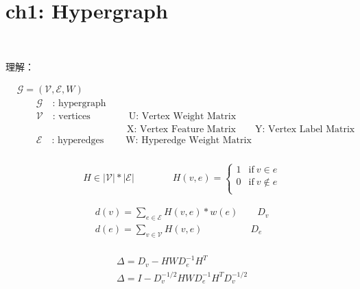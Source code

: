 \documentclass{article}
\begin{document}
\section*{ch1: Hypergraph}


~ \\[3pt]
\begin{CJK}{UTF8}{gbsn}
    理解： \\[3pt]
\end{CJK}


%
\begin{align*}
    & \mathcal{G} = ( \mathcal{V} , \mathcal{E} , W ) \\[3pt]
        & \qquad \mathcal{G} \quad \text{: hypergraph} \\[3pt]
        & \qquad \mathcal{V} \quad \text{: vertices} 
          \qquad \qquad \text{U: Vertex Weight Matrix} \\[3pt]
        & \qquad \qquad \qquad \qquad \qquad \quad \ \ \text{X: Vertex Feature Matrix} 
          \qquad \text{Y: Vertex Label Matrix} \\[3pt]
        & \qquad \mathcal{E} \quad \text{: hyperedges} 
          \qquad \; \text{W: Hyperedge Weight Matrix} \\[3pt]
\end{align*}

%
\begin{align*}
    & H \in { |\mathcal{V}| * |\mathcal{E}| } \qquad \qquad 
    H(v, e) = \left\{ 
        \begin{array}{cc}
            1       & \text{if} \ v \in e    \\[3pt]
            0       & \text{if} \ v \notin e \\[3pt]
        \end{array} \right. 
\end{align*}

%
\begin{align*}
    & d(v) = \sum_{e \in \mathcal{E}} H(v, e)*w(e) \qquad D_{v} \\[3pt]
    & d(e) = \sum_{v \in \mathcal{V}} H(v, e)      \qquad \qquad \quad D_{e} \\[3pt]
\end{align*}

%
\begin{align*}
    & \Delta = D_{v} - H W D_{e}^{-1} H^{T} \\[3pt]
    & \Delta = I - D_{v}^{-1/2} H W D_{e}^{-1} H^{T} D_{v}^{-1/2} \\[3pt]
\end{align*}
\end{document}
